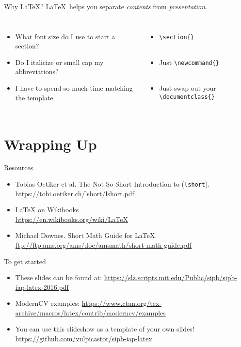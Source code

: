 \documentclass{beamer}
\newcommand{\pLaTeX}{{\rmfamily\LaTeX}}
\begin{document}
\begin{frame}{Why \pLaTeX?}
\pLaTeX\ helps you separate \emph{contents} from \emph{presentation}.

\begin{columns}[c]
    \begin{itemize}
        \item What font size do I use to start a section?
        \item Do I italicize or small cap my abbreviations?
        \item I have to spend so much time matching the template
    \end{itemize}
    \begin{itemize}
        \item \texttt{\textbackslash section\{\}} \\ \ 
        \item Just \texttt{\textbackslash newcommand\{\}} \\ \ 
        \item Just swap out your \texttt{\textbackslash documentclass\{\}}
    \end{itemize}
\end{columns}

\end{frame}


\section{Wrapping Up}

\begin{frame}{Resources}
\begin{itemize}
    \item Tobias Oetiker et al. The Not So Short Introduction to {\rmfamily\LaTeXe} (\texttt{lshort}).\\
        \url{https://tobi.oetiker.ch/lshort/lshort.pdf}
    \item {\rmfamily\LaTeX} on Wikibooks\\
        \url{https://en.wikibooks.org/wiki/LaTeX}
    \item Michael Downes. Short Math Guide for {\rmfamily\LaTeX}.\\
        \url{ftp://ftp.ams.org/ams/doc/amsmath/short-math-guide.pdf}
\end{itemize}
\end{frame}

\begin{frame}{To get started}
\begin{itemize}
    \item These slides can be found at:
        \url{https://slz.scripts.mit.edu/Public/sipb/sipb-iap-latex-2016.pdf}
    \item ModernCV examples:
        \url{https://www.ctan.org/tex-archive/macros/latex/contrib/moderncv/examples}
    \item You can use this slideshow as a template of your own slides!
        \url{https://github.com/vulpicastor/sipb-iap-latex}
\end{itemize}
\end{frame}
\end{document}

